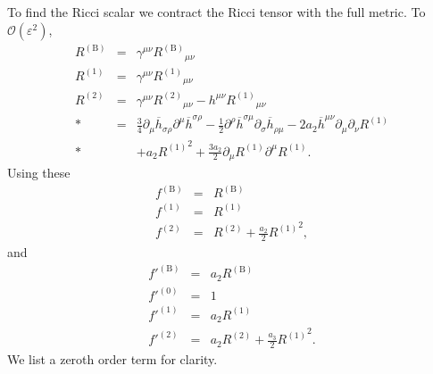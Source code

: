 \documentclass[aps,prd,amsfonts,amssymb,amsmath,nofootinbib,reprint,showpacs]{revtex4-1}
\newcommand{\recip}[1]{\ensuremath{\frac{1}{#1}}}
\newcommand{\order}[1]{\ensuremath{\mathcal{O}({#1})}}
\begin{document}
To find the Ricci scalar we contract the Ricci tensor with the full metric. To $\order{\varepsilon^2}$,
\begin{eqnarray}
R^{(\text{B})} & = & \gamma^{\mu\nu} {R^{(\text{B})}}_{\mu\nu} \\
R^{(1)} & = & \gamma^{\mu\nu} {R^{(1)}}_{\mu\nu} \\
R^{(2)} & = & \gamma^{\mu\nu} {R^{(2)}}_{\mu\nu} - h^{\mu\nu} {R^{(1)}}_{\mu\nu} \nonumber \\*
 & = & \frac{3}{4}\partial_\mu\overline{h}_{\sigma\rho}\partial^\mu\overline{h}^{\sigma\rho} - \recip{2} \partial^\rho\overline{h}^{\sigma\mu}\partial_\sigma\overline{h}_{\rho\mu} - 2a_2 \overline{h}^{\mu\nu}\partial_\mu\partial_\nu R^{(1)} \nonumber \\*
 & & + a_2 {R^{(1)}}^2 + \frac{3a_2}{2}\partial_\mu R^{(1)} \partial^\mu R^{(1)}.
\end{eqnarray}
Using these
\begin{eqnarray}
f^{(\text{B})} & = & R^{(\text{B})} \\
f^{(1)} & = & R^{(1)} \\
f^{(2)} & = & R^{(2)} + \frac{a_2}{2}{R^{(1)}}^2,
\end{eqnarray}
and
\begin{eqnarray}
f'^{(\text{B})} & = & a_2 R^{(\text{B})} \\
f'^{(0)} & = & 1 \\
f'^{(1)} & = & a_2 R^{(1)} \\
f'^{(2)} & = & a_2 R^{(2)} + \frac{a_3}{2}{R^{(1)}}^2.
\end{eqnarray}
We list a zeroth order term for clarity.
\end{document}
